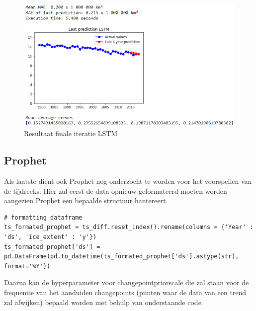 \begin{figure}
    \centering
    \caption{Resultaat finale iteratie LSTM}
    \label{fig:uvnslstm}
    \includegraphics[width=1\linewidth]{uv_ns_LSTM}
\end{figure}

\clearpage
\subsection{Prophet}

Als laatste dient ook Prophet nog onderzocht te worden voor het voorspellen van de tijdreeks. Hier zal eerst de data opnieuw geformateerd moeten worden aangezien Prophet een bepaalde structuur hantereert.

\begin{verbatim}
# formatting dataframe
ts_formated_prophet = ts_diff.reset_index().rename(columns = {'Year' : 'ds', 'ice_extent' : 'y'})
ts_formated_prophet['ds'] = pd.DataFrame(pd.to_datetime(ts_formated_prophet['ds'].astype(str), format='%Y'))
\end{verbatim}

Daarna kan de hyperparameter voor changepoint\textunderscore prior\textunderscore scale die zal staan voor de frequentie van het aanduiden changepoints (punten waar de data van een trend zal afwijken) bepaald worden met behulp van onderstaande code.

